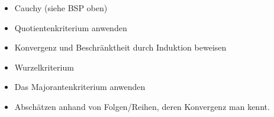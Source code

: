 \documentclass[a4paper]{article}
\begin{document}
	\begin{falgo}
		\begin{multicols}{2}
		\begin{itemize}
			\item Cauchy (siehe BSP oben)
			\item Quotientenkriterium anwenden
			\item Konvergenz und Beschränktheit durch Induktion beweisen 
		\end{itemize}
		\columnbreak
		\begin{itemize}
			\item Wurzelkriterium
			\item Das Majorantenkriterium anwenden
			\item Abschätzen anhand von Folgen/Reihen, deren  Konvergenz man kennt.
		\end{itemize}
		\end{multicols}
		\vspace{-3mm}
	\end{falgo}

% 	
\end{document}
